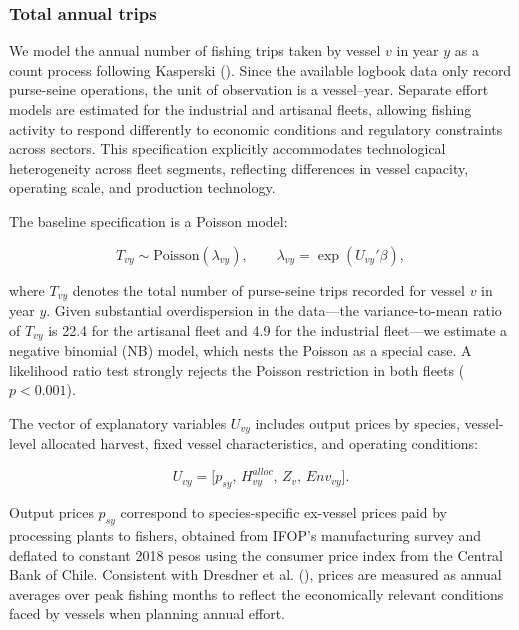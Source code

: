 \documentclass[
  11pt,
]{article}
\begin{document}
\subsubsection{Total annual trips}\label{total-annual-trips}

We model the annual number of fishing trips taken by vessel \(v\) in year \(y\) as a count process following Kasperski (). Since the available logbook data only record purse-seine operations, the unit of observation is a vessel--year. Separate effort models are estimated for the industrial and artisanal fleets, allowing fishing activity to respond differently to economic conditions and regulatory constraints across sectors. This specification explicitly accommodates technological heterogeneity across fleet segments, reflecting differences in vessel capacity, operating scale, and production technology.

The baseline specification is a Poisson model:

\begin{equation}
T_{vy} \sim \text{Poisson}(\lambda_{vy}), \qquad 
\lambda_{vy} = \exp\!\left(U_{vy}'\beta\right),
\label{eq:poisson_trips}
\end{equation}

where \(T_{vy}\) denotes the total number of purse-seine trips recorded for vessel \(v\) in year \(y\). Given substantial overdispersion in the data---the variance-to-mean ratio of \(T_{vy}\) is 22.4 for the artisanal fleet and 4.9 for the industrial fleet---we estimate a negative binomial (NB) model, which nests the Poisson as a special case. A likelihood ratio test strongly rejects the Poisson restriction in both fleets (\(p < 0.001\)).

The vector of explanatory variables \(U_{vy}\) includes output prices by species, vessel-level allocated harvest, fixed vessel characteristics, and operating conditions:

\begin{equation}
U_{vy}=\big[p_{sy},\, H^{alloc}_{vy},\, Z_v,\, Env_{vy}\big].
\label{eq:U_trips}
\end{equation}

Output prices \(p_{sy}\) correspond to species-specific ex-vessel prices paid by processing plants to fishers, obtained from IFOP's manufacturing survey and deflated to constant 2018 pesos using the consumer price index from the Central Bank of Chile. Consistent with Dresdner et al. (), prices are measured as annual averages over peak fishing months to reflect the economically relevant conditions faced by vessels when planning annual effort.
\end{document}
